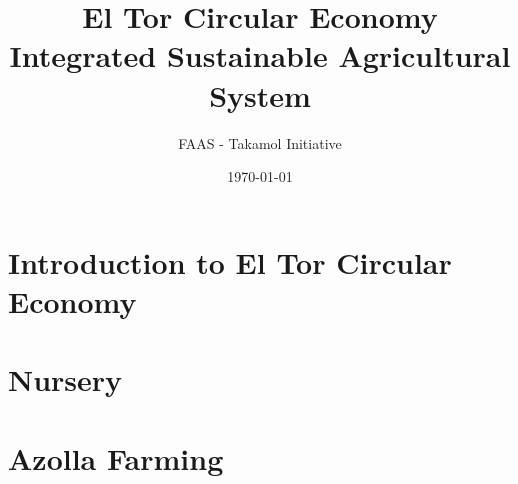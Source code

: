 \documentclass[12pt,a4paper]{report}
\title{El Tor Circular Economy\\
\large Integrated Sustainable Agricultural System}
\author{FAAS - Takamol Initiative}
\date{\today}
\begin{document}
\maketitle
\tableofcontents

\chapter{Introduction to El Tor Circular Economy}


\chapter{Nursery}









\chapter{Azolla Farming}








\end{document}
